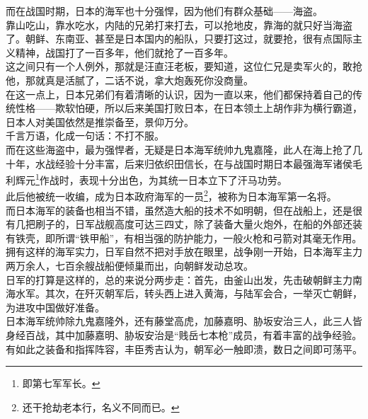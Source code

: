 \begin{multicols}{\theparacolNo}
而在战国时期，日本的海军也十分强悍，因为他们有群众基础——海盗。\\

靠山吃山，靠水吃水，内陆的兄弟打来打去，可以抢地皮，靠海的就只好当海盗了。朝鲜、东南亚、甚至是日本国内的船队，只要打这过，就要抢，很有点国际主义精神，战国打了一百多年，他们就抢了一百多年。\\

这之间只有一个人例外，那就是汪直汪老板，要知道，这位仁兄是卖军火的，敢抢他，那就真是活腻了，二话不说，拿大炮轰死你没商量。\\

在这一点上，日本兄弟们有着清晰的认识，因为一直以来，他们都保持着自己的传统性格——欺软怕硬，所以后来美国打败日本，在日本领土上胡作非为横行霸道，日本人对美国依然是推崇备至，景仰万分。\\

千言万语，化成一句话：不打不服。\\

而在这些海盗中，最为强悍者，无疑是日本海军统帅九鬼嘉隆，此人在海上抢了几十年，水战经验十分丰富，后来归依织田信长，在与战国时期日本最强海军诸侯毛利辉元\footnote{即第七军军长。}作战时，表现十分出色，为其统一日本立下了汗马功劳。\\

此后他被统一收编，成为日本政府海军的一员\footnote{还干抢劫老本行，名义不同而已。}，被称为日本海军第一名将。\\

而日本海军的装备也相当不错，虽然造大船的技术不如明朝，但在战船上，还是很有几把刷子的，日军战舰高度可达三四丈，除了装备大量火炮外，在船的外部还装有铁壳，即所谓“铁甲船”，有相当强的防护能力，一般火枪和弓箭对其毫无作用。\\

拥有这样的海军实力，日军自然不把对手放在眼里，战争刚一开始，日本海军主力两万余人，七百余艘战船便倾巢而出，向朝鲜发动总攻。\\

日军的打算是这样的，总的来说分两步走：首先，由釜山出发，先击破朝鲜主力南海水军。其次，在歼灭朝军后，转头西上进入黄海，与陆军会合，一举灭亡朝鲜，为进攻中国做好准备。\\

日本海军统帅除九鬼嘉隆外，还有藤堂高虎，加藤嘉明、胁坂安治三人，此三人皆身经百战，其中加藤嘉明、胁坂安治是“贱岳七本枪”成员，有着丰富的战争经验。\\

有如此之装备和指挥阵容，丰臣秀吉认为，朝军必一触即溃，数日之间即可荡平。\\


\end{multicols}

